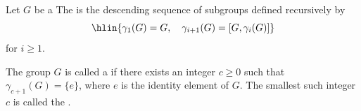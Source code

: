 \begin{definition} \label{definition:nilpotent_group_via_lower_central_series}
Let $G$ be a 
The  is the descending sequence of subgroups defined recursively by
$$\hlin{\gamma_1(G) = G, \quad \gamma_{i+1}(G) = [G, \gamma_i(G)]}$$
 for $i \geq 1$.

The group $G$ is called a  if there exists an integer $c \geq 0$ such that $\gamma_{c+1}(G) = \{e\}$, where $e$ is the identity element of $G$. The smallest such integer $c$ is called the .
\end{definition}